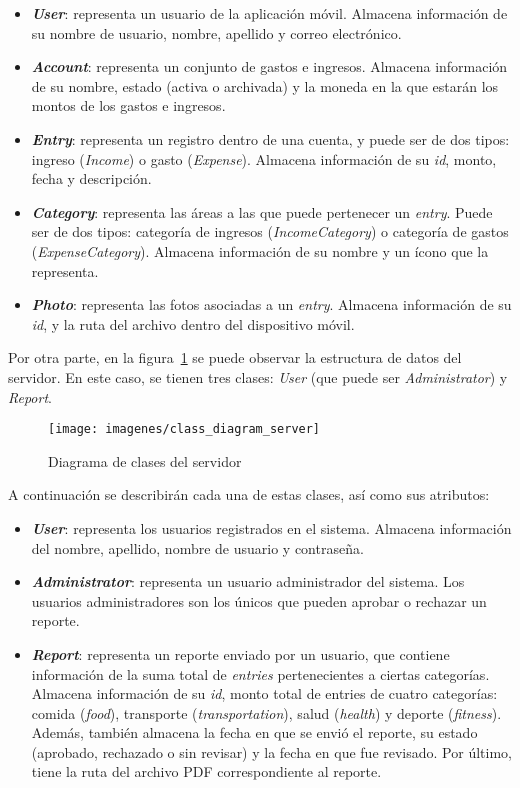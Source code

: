 \begin{itemize}
  \item \textbf{\textit{User}}: representa un usuario de la aplicación móvil. Almacena información de su nombre de usuario, nombre, apellido y correo electrónico.
	\item \textbf{\textit{Account}}: representa un conjunto de gastos e ingresos. Almacena información de su nombre, estado (activa o archivada) y la moneda en la que estarán los montos de los gastos e ingresos.
	\item \textbf{\textit{Entry}}: representa un registro dentro de una cuenta, y puede ser de dos tipos: ingreso (\textit{Income}) o gasto (\textit{Expense}). Almacena información de su \textit{id}, monto, fecha y descripción.
	\item \textbf{\textit{Category}}: representa las áreas a las que puede pertenecer un \textit{entry}. Puede ser de dos tipos: categoría de ingresos (\textit{IncomeCategory}) o categoría de gastos (\textit{ExpenseCategory}). Almacena información de su nombre y un ícono que la representa.
	\item \textbf{\textit{Photo}}: representa las fotos asociadas a un \textit{entry}. Almacena información de su \textit{id}, y la ruta del archivo dentro del dispositivo móvil.
\end{itemize}

Por otra parte, en la figura~\ref{fig:diagramaClasesServidor} se puede observar la estructura de datos del servidor. En este caso, se tienen tres clases: \textit{User} (que puede ser \textit{Administrator}) y \textit{Report}.

\begin{figure}[ht]
  \centering
  \texttt{[image: imagenes/class\_diagram\_server]}
  \caption{Diagrama de clases del servidor}
  \label{fig:diagramaClasesServidor}
\end{figure}

A continuación se describirán cada una de estas clases, así como sus atributos:

\begin{itemize}
	\item \textbf{\textit{User}}: representa los usuarios registrados en el sistema. Almacena información del nombre, apellido, nombre de usuario y contraseña. 
	\item \textbf{\textit{Administrator}}: representa un usuario administrador del sistema. Los usuarios administradores son los únicos que pueden aprobar o rechazar un reporte.
	\item \textbf{\textit{Report}}: representa un reporte enviado por un usuario, que contiene información de la suma total de \textit{entries} pertenecientes a ciertas categorías. Almacena información de su \textit{id}, monto total de entries de cuatro categorías: comida (\textit{food}), transporte (\textit{transportation}), salud (\textit{health}) y deporte (\textit{fitness}). Además, también almacena la fecha en que se envió el reporte, su estado (aprobado, rechazado o sin revisar) y la fecha en que fue revisado. Por último, tiene la ruta del archivo PDF correspondiente al reporte.
\end{itemize} 

